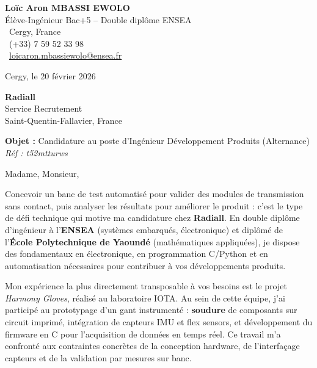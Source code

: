 \documentclass[a4paper,11pt]{article}
\begin{document}
\noindent
\begin{minipage}[t]{0.5\textwidth}
    \textbf{Loïc Aron MBASSI EWOLO}\\
    Élève-Ingénieur Bac+5 -- Double diplôme ENSEA\\[3pt]
    \faMapMarker\ Cergy, France\\
    \faPhone\ (+33) 7 59 52 33 98\\
    \faEnvelope\ \href{mailto:loicaron.mbassiewolo@ensea.fr}{loicaron.mbassiewolo@ensea.fr}
\end{minipage}
\hfill
\begin{minipage}[t]{0.4\textwidth}
    \raggedleft
    Cergy, le 20 février 2026
\end{minipage}

\vspace{1.2cm}

\hfill
\begin{minipage}[t]{0.5\textwidth}
    \raggedleft
    \textbf{Radiall}\\
    Service Recrutement\\
    Saint-Quentin-Fallavier, France
\end{minipage}

\vspace{1cm}

\noindent\textbf{Objet :} Candidature au poste d'Ingénieur Développement Produits (Alternance)\\
\textit{Réf : t52mtturws}

\vspace{0.8cm}

Madame, Monsieur,

Concevoir un banc de test automatisé pour valider des modules de transmission sans contact, puis analyser les résultats pour améliorer le produit : c'est le type de défi technique qui motive ma candidature chez \textbf{Radiall}. En double diplôme d'ingénieur à l'\textbf{ENSEA} (systèmes embarqués, électronique) et diplômé de l'\textbf{École Polytechnique de Yaoundé} (mathématiques appliquées), je dispose des fondamentaux en électronique, en programmation C/Python et en automatisation nécessaires pour contribuer à vos développements produits.

Mon expérience la plus directement transposable à vos besoins est le projet \textit{Harmony Gloves}, réalisé au laboratoire IOTA. Au sein de cette équipe, j'ai participé au prototypage d'un gant instrumenté : \textbf{soudure} de composants sur circuit imprimé, intégration de capteurs IMU et flex sensors, et développement du firmware en C pour l'acquisition de données en temps réel. Ce travail m'a confronté aux contraintes concrètes de la conception hardware, de l'interfaçage capteurs et de la validation par mesures sur banc.
\end{document}
